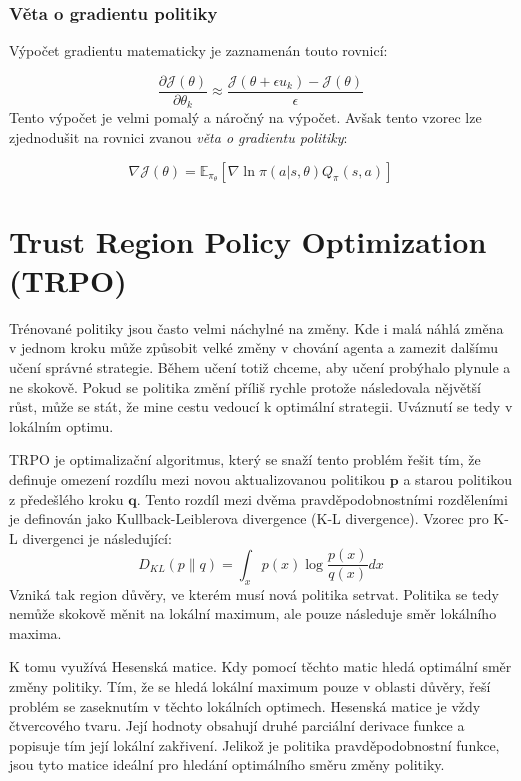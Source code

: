\subsubsection*{Věta o gradientu politiky}
Výpočet gradientu matematicky je zaznamenán touto rovnicí:

\begin{equation}
  \label{eq:gradient_politiky}
  \frac{\partial \mathcal{J}(\theta)}{\partial \theta_k} \approx \frac{\mathcal{J}(\theta + \epsilon u_k) - \mathcal{J}(\theta)}{\epsilon}
\end{equation}
Tento výpočet je velmi pomalý a náročný na výpočet.
Avšak tento vzorec lze zjednodušit na rovnici zvanou \emph{věta o gradientu politiky}:

\begin{equation}
    \label{eq:veta_o_gradientu_politiky}
  \nabla \mathcal{J}(\theta) = \mathbb{E}_{\pi_\theta} [\nabla \ln \pi(a \vert s, \theta) Q_\pi(s, a)]
\end{equation}

\section{Trust Region Policy Optimization (TRPO)}\label{sec:trust-region-policy-optimization}
Trénované politiky jsou často velmi náchylné na změny.
Kde i malá náhlá změna v jednom kroku může způsobit velké změny v chování agenta a zamezit dalšímu učení správné strategie.
Během učení totiž chceme, aby učení probýhalo plynule a ne skokově.
Pokud se politika změní příliš rychle protože následovala nějvětší růst, může se stát, že mine cestu vedoucí k optimální strategii.
Uváznutí se tedy v lokálním optimu.\pagebreak

TRPO je optimalizační algoritmus, který se snaží tento problém řešit tím, že definuje omezení rozdílu mezi novou aktualizovanou politikou $\textbf{p}$ a starou politikou z předešlého kroku $\textbf{q}$.
Tento rozdíl mezi dvěma pravděpodobnostními rozděleními je definován jako Kullback-Leiblerova divergence (K-L divergence)\cite{KL_divergence}.
Vzorec pro K-L divergenci je následující:
\begin{equation}
  D_{KL}(p \| q) = \int_x p(x) \log \frac{p(x)}{q(x)} dx
\end{equation}
Vzniká tak region důvěry, ve kterém musí nová politika setrvat.
Politika se tedy nemůže skokově měnit na lokální maximum, ale pouze následuje směr lokálního maxima.

K tomu využívá Hesenská matice.
Kdy pomocí těchto matic hledá optimální směr změny politiky.
Tím, že se hledá lokální maximum pouze v oblasti důvěry, řeší problém se zaseknutím v těchto lokálních optimech.
Hesenská matice je vždy čtvercového tvaru.
Její hodnoty obsahují druhé parciální derivace funkce a popisuje tím její lokální zakřivení.
Jelikož je politika pravděpodobnostní funkce, jsou tyto matice ideální pro hledání optimálního směru změny politiky.

